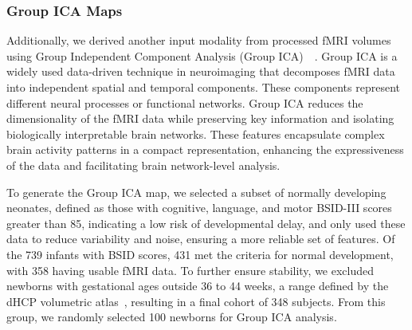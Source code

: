 \documentclass[runningheads,a4paper]{llncs}
\begin{document}
\subsubsection{Group ICA Maps}
Additionally, we derived another input modality from processed fMRI volumes using Group Independent Component Analysis (Group ICA)~\cite{Hyvarinen1999}~\cite{Beckmann2004}. Group ICA is a widely used data-driven technique in neuroimaging that decomposes fMRI data into independent spatial and temporal components. These components represent different neural processes or functional networks. Group ICA reduces the dimensionality of the fMRI data while preserving key information and isolating biologically interpretable brain networks. These features encapsulate complex brain activity patterns in a compact representation, enhancing the expressiveness of the data and facilitating brain network-level analysis.


To generate the Group ICA map, we selected a subset of normally developing neonates, defined as those with cognitive, language, and motor BSID-III scores greater than 85, indicating a low risk of developmental delay, and only used these data to reduce variability and noise, ensuring a more reliable set of features.
%
Of the 739 infants with BSID scores, 431 met the criteria for normal development, with 358 having usable fMRI data. To further ensure stability, we excluded newborns with gestational ages outside 36 to 44 weeks, a range defined by the dHCP volumetric atlas~\cite{Schuh2018}, resulting in a final cohort of 348 subjects. From this group, we randomly selected 100 newborns for Group ICA analysis.

\end{document}
